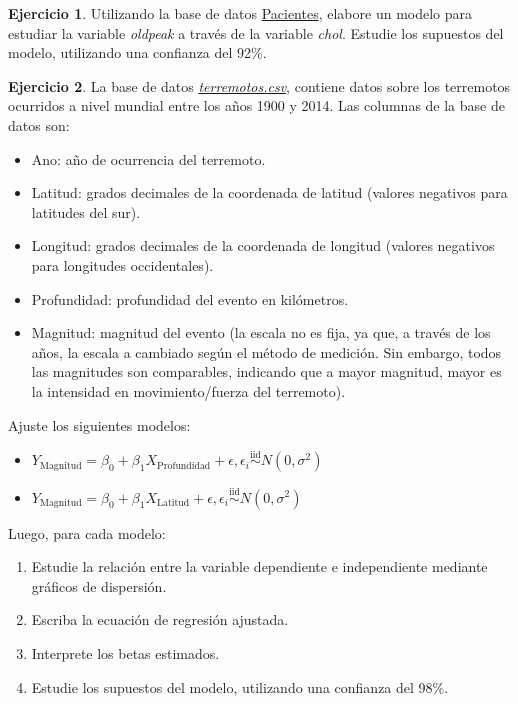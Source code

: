 \documentclass[
  11pt,
]{book}
\providecommand{\tightlist}{%
  \setlength{\itemsep}{0pt}\setlength{\parskip}{0pt}}
\theoremstyle{definition}
\theoremstyle{definition}
\theoremstyle{definition}
\newtheorem{exercise}{Ejercicio}[chapter]
\theoremstyle{definition}
\theoremstyle{remark}
\begin{document}
\begin{exercise}
Utilizando la base de datos \hyperref[Pacientes]{Pacientes}, elabore un modelo para estudiar la variable \emph{oldpeak} a través de la variable \emph{chol}. Estudie los supuestos del modelo, utilizando una confianza del 92\%.
\end{exercise}

\begin{exercise}

La base de datos \href{https://raw.githubusercontent.com/Dfranzani/Bases-de-datos-para-cursos/main/2022-2/Estad\%C3\%ADstica\%202/terremotos.csv}{\emph{terremotos.csv}}, contiene datos sobre los terremotos ocurridos a nivel mundial entre los años 1900 y 2014. Las columnas de la base de datos son:

\begin{itemize}
\tightlist
\item
  Ano: año de ocurrencia del terremoto.
\item
  Latitud: grados decimales de la coordenada de latitud (valores negativos para latitudes del sur).
\item
  Longitud: grados decimales de la coordenada de longitud (valores negativos para longitudes occidentales).
\item
  Profundidad: profundidad del evento en kilómetros.
\item
  Magnitud: magnitud del evento (la escala no es fija, ya que, a través de los años, la escala a cambiado según el método de medición. Sin embargo, todos las magnitudes son comparables, indicando que a mayor magnitud, mayor es la intensidad en movimiento/fuerza del terremoto).
\end{itemize}

Ajuste los siguientes modelos:

\begin{itemize}
\item
  \(Y_{\text{Magnitud}} = \beta_0 + \beta_1X_{\text{Profundidad}} + \epsilon, \epsilon_i \overset{\text{iid}}{\sim} N(0,\sigma^2)\)
\item
  \(Y_{\text{Magnitud}} = \beta_0 + \beta_1X_{\text{Latitud}} + \epsilon, \epsilon_i \overset{\text{iid}}{\sim} N(0,\sigma^2)\)
\end{itemize}

Luego, para cada modelo:

\begin{enumerate}
\def\labelenumi{\arabic{enumi}.}
\tightlist
\item
  Estudie la relación entre la variable dependiente e independiente mediante gráficos de dispersión.
\item
  Escriba la ecuación de regresión ajustada.
\item
  Interprete los betas estimados.
\item
  Estudie los supuestos del modelo, utilizando una confianza del 98\%.
\end{enumerate}

\end{exercise}
\end{document}
